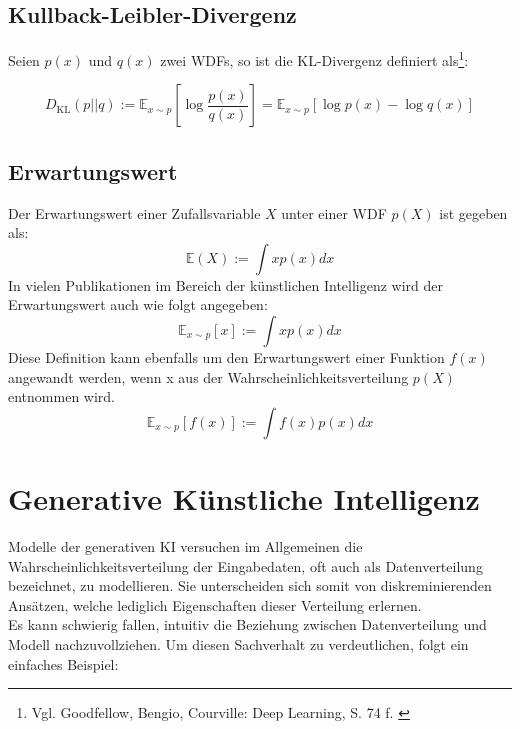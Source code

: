 \subsection{Kullback-Leibler-Divergenz}

Seien $p(x)$ und $q(x)$ zwei WDFs, so ist die KL-Divergenz definiert als\footnote{
    Vgl. Goodfellow, Bengio, Courville: Deep Learning, S. 74 f.
    \cite{Goodfellow-et-al-2016}
}:

\begin{equation}
D_\text{KL}(p||q) 
:= \mathbb{E}_{x \sim p} \left [
\log \frac{p(x)} {q(x)}
\right ]
= \mathbb{E}_{x \sim p} \left [ 
    \log p(x) - \log q(x)
    \right ]
\end{equation}

\subsection{Erwartungswert}

Der Erwartungswert einer Zufallsvariable $X$ unter einer WDF $p(X)$ ist gegeben als: 
\begin{equation}
    \mathbb E(X) := \int x p(x) dx
\end{equation}
In vielen Publikationen im Bereich der künstlichen Intelligenz wird der Erwartungswert auch wie folgt angegeben:
\begin{equation}
    \mathbb E_{x \sim p}[x] := \int x p(x) dx
\end{equation}
Diese Definition kann ebenfalls um den Erwartungswert einer Funktion $f(x)$ angewandt werden, wenn x aus der Wahrscheinlichkeitsverteilung $p(X)$ entnommen wird. 
\begin{equation}
    \mathbb E_{x \sim p}[f(x)] := \int f(x) p(x) dx
\end{equation}



\section{Generative Künstliche Intelligenz}

Modelle der generativen KI versuchen im Allgemeinen die Wahrscheinlichkeitsverteilung der Eingabedaten, oft auch als Datenverteilung bezeichnet, zu modellieren. Sie unterscheiden sich somit von diskreminierenden Ansätzen, welche lediglich Eigenschaften dieser Verteilung erlernen. \\
Es kann schwierig fallen, intuitiv die Beziehung zwischen Datenverteilung und Modell nachzuvollziehen. Um diesen Sachverhalt zu verdeutlichen, folgt ein einfaches Beispiel:

